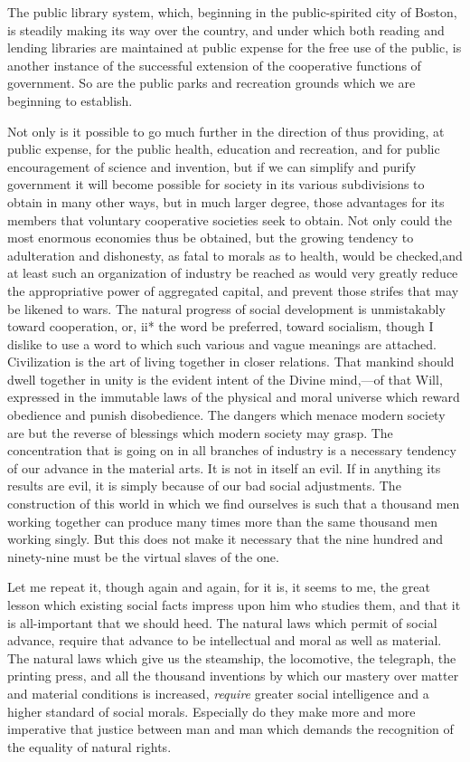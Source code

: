 \documentclass{book}
\begin{document}
The public library system, which, beginning in the public-spirited city of Boston, is steadily making its way over the country, and under which both reading and lending libraries are maintained at public expense for the free use of the public, is another instance of the successful extension of the cooperative functions of government. So are the public parks and recreation grounds which we are beginning to establish.

Not only is it possible to go much further in the direction of thus providing, at public expense, for the public health, education and recreation, and for public encouragement of science and invention, but if we can simplify and purify government it will become possible for society in its various subdivisions to obtain in many other ways, but in much larger degree, those advantages for its members that voluntary cooperative societies seek to obtain. Not only could the most enormous economies thus be obtained, but the growing tendency to adulteration and dishonesty, as fatal to morals as to health, would be checked,\footnotemark[1] and at least such an organization of industry be reached as would very greatly reduce the appropriative power of aggregated capital, and prevent those strifes that may be likened to wars. The natural progress of social development is unmistakably toward cooperation, or, ii* the word be preferred, toward socialism, though I dislike to use a word to which such various and vague meanings are attached. Civilization is the art of living together in closer relations. That mankind should dwell together in unity is the evident intent of the Divine mind,—of that Will, expressed in the immutable laws of the physical and moral universe which reward obedience and punish disobedience. The dangers which menace modern society are but the reverse of blessings which modern society may grasp. The concentration that is going on in all branches of industry is a necessary tendency of our advance in the material arts. It is not in itself an evil. If in anything its results are evil, it is simply because of our bad social adjustments. The construction of this world in which we find ourselves is such that a thousand men working together can produce many times more than the same thousand men working singly. But this does not make it necessary that the nine hundred and ninety-nine must be the virtual slaves of the one.

Let me repeat it, though again and again, for it is, it seems to me, the great lesson which existing social facts impress upon him who studies them, and that it is all-important that we should heed. The natural laws which permit of social advance, require that advance to be intellectual and moral as well as material. The natural laws which give us the steamship, the locomotive, the telegraph, the printing press, and all the thousand inventions by which our mastery over matter and material conditions is increased, \emph{require} greater social intelligence and a higher standard of social morals. Especially do they make more and more imperative that justice between man and man which demands the recognition of the equality of natural rights.
\end{document}

